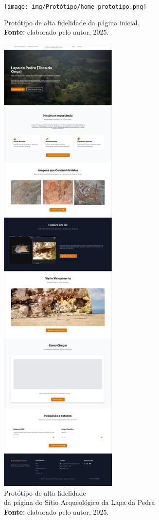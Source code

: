 \begin{figure}[H]
    \centering
    \begin{minipage}[b]{0.48\textwidth}
        \centering
        \texttt{[image: img/Protótipo/home prototipo.png]}
        \caption{Protótipo de alta fidelidade da página inicial. \\
            \textbf{Fonte:} elaborado pelo autor, 2025.}
        \label{fig:prototipo_home}
    \end{minipage}
    \hfill
    \begin{minipage}[b]{0.48\textwidth}
        \centering
        \includegraphics[height=24cm, keepaspectratio]{img/Protótipo/prototipo alta fidelidade toca da onça.png}
        \caption{Protótipo de alta fidelidade \\da página do Sítio Arqueológico da Lapa da Pedra \\
            \textbf{Fonte:} elaborado pelo autor, 2025.}
        \label{fig:prototipo_lapadapedra}
    \end{minipage}
\end{figure}

